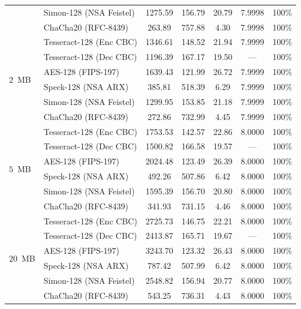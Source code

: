 \documentclass[10pt,twocolumn]{article}
\begin{document}
\begin{table}[t]
{\begin{tabular}{@{}llccccc@{}}
 & Simon-128 (NSA Feistel)      & 1275.59 & 156.79 & 20.79 & 7.9998 & 100\% \\
 & ChaCha20 (RFC-8439)          & 263.89  & 757.88 & 4.30  & 7.9998 & 100\% \\ \midrule
\multirow{6}{*}{$2$~MB} 
 & Tesseract-128 (Enc CBC)        & 1346.61 & 148.52 & 21.94 & 7.9999 & 100\% \\
 & Tesseract-128 (Dec CBC)        & 1196.39 & 167.17 & 19.50 & --- & 100\% \\
 & AES-128 (FIPS-197)          & 1639.43 & 121.99 & 26.72 & 7.9999 & 100\% \\
 & Speck-128 (NSA ARX)          & 385.81  & 518.39 & 6.29  & 7.9999 & 100\% \\
 & Simon-128 (NSA Feistel)      & 1299.95 & 153.85 & 21.18 & 7.9999 & 100\% \\
 & ChaCha20 (RFC-8439)          & 272.86  & 732.99 & 4.45  & 7.9999 & 100\% \\ \midrule
\multirow{6}{*}{$5$~MB} 
 & Tesseract-128 (Enc CBC)        & 1753.53 & 142.57 & 22.86 & 8.0000 & 100\% \\
 & Tesseract-128 (Dec CBC)        & 1500.82 & 166.58 & 19.57 & --- & 100\% \\
 & AES-128 (FIPS-197)          & 2024.48 & 123.49 & 26.39 & 8.0000 & 100\% \\
 & Speck-128 (NSA ARX)          & 492.26  & 507.86 & 6.42  & 8.0000 & 100\% \\
 & Simon-128 (NSA Feistel)      & 1595.39 & 156.70 & 20.80 & 8.0000 & 100\% \\
 & ChaCha20 (RFC-8439)          & 341.93  & 731.15 & 4.46  & 8.0000 & 100\% \\ \midrule
\multirow{6}{*}{$20$~MB} 
 & Tesseract-128 (Enc CBC)        & 2725.73 & 146.75 & 22.21 & 8.0000 & 100\% \\
 & Tesseract-128 (Dec CBC)        & 2413.87 & 165.71 & 19.67 & --- & 100\% \\
 & AES-128 (FIPS-197)          & 3243.70 & 123.32 & 26.43 & 8.0000 & 100\% \\
 & Speck-128 (NSA ARX)          & 787.42  & 507.99 & 6.42  & 8.0000 & 100\% \\
 & Simon-128 (NSA Feistel)      & 2548.82 & 156.94 & 20.77 & 8.0000 & 100\% \\
  & ChaCha20 (RFC-8439)          & 543.25  & 736.31 & 4.43  & 8.0000 & 100\% \\ \bottomrule
\end{tabular}%
}
\end{table}
\end{document}
